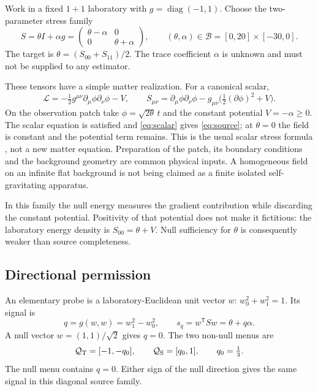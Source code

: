 \documentclass[12pt,a4paper]{article}
\theoremstyle{definition}
\begin{document}
Work in a fixed $1+1$ laboratory with $g=\operatorname{diag}(-1,1)$.
Choose the two-parameter stress family
\begin{equation}
 S=\theta I+\alpha g
   =\begin{pmatrix}\theta-\alpha&0\\0&\theta+\alpha\end{pmatrix},
 \qquad (\theta,\alpha)\in\mathcal B=[0,20]\times[-30,0].
 \label{eq:source}
\end{equation}
The target is $\theta=(S_{00}+S_{11})/2$. The trace coefficient $\alpha$
is unknown and must not be supplied to any estimator.

These tensors have a simple matter realization. For a canonical scalar,
\begin{equation}
 \mathcal L=-\tfrac12 g^{\mu\nu}\partial_\mu\phi\partial_\nu\phi-V,
 \qquad
 S_{\mu\nu}=\partial_\mu\phi\partial_\nu\phi
 -g_{\mu\nu}\bigl(\tfrac12(\partial\phi)^2+V\bigr).
 \label{eq:scalar}
\end{equation}
On the observation patch take $\phi=\sqrt{2\theta}\,t$ and the constant
potential $V=-\alpha\geq0$. The scalar equation is satisfied and
\eqref{eq:scalar} gives \eqref{eq:source}; at $\theta=0$ the field is
constant and the potential term remains. This is the usual scalar stress
formula \cite{Wald1984,Hu2018}, not a new matter equation. Preparation of
the patch, its boundary conditions and the background geometry are common
physical inputs. A homogeneous field on an infinite flat background is
not being claimed as a finite isolated self-gravitating apparatus.

In this family the null energy measures the gradient contribution while
discarding the constant potential. Positivity of that potential does not
make it fictitious: the laboratory energy density is
$S_{00}=\theta+V$. Null sufficiency for $\theta$ is consequently weaker
than source completeness.

\subsection{Directional permission}

An elementary probe is a laboratory-Euclidean unit vector $w$:
$w_0^2+w_1^2=1$. Its signal is
\begin{equation}
 q=g(w,w)=w_1^2-w_0^2,\qquad
 s_q=w^\mathsf T S w=\theta+q\alpha .
 \label{eq:signal}
\end{equation}
A null vector $w=(1,1)/\sqrt2$ gives $q=0$. The two non-null menus are
\begin{equation}
 \mathcal Q_{\rm T}=[-1,-q_0],\qquad
 \mathcal Q_{\rm S}=[q_0,1],\qquad q_0=\tfrac13.
 \label{eq:menus}
\end{equation}
The null menu contains $q=0$. Either sign of the null direction gives the
same signal in this diagonal source family.
\end{document}
